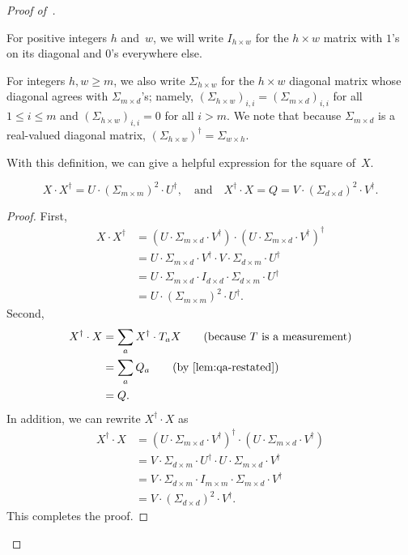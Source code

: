 \begin{proof}[Proof of~]
\begin{notation}
For positive integers $h$ and~$w$,
we will write $I_{h \times w}$ for the $h \times w$ matrix with $1$'s on its diagonal and $0$'s everywhere else.

For integers $h, w \geq m$, we also write $\Sigma_{h \times w}$
for the $h \times w$ diagonal matrix whose diagonal agrees with $\Sigma_{m \times d}$'s;
namely, $(\Sigma_{h \times w})_{i, i} = (\Sigma_{m \times d})_{i,i}$ for all $1 \leq i \leq m$
and $(\Sigma_{h \times w})_{i, i} = 0$ for all $i > m$.
We note that because $\Sigma_{m \times d}$ is a real-valued diagonal matrix,
$(\Sigma_{h \times w})^\dagger = \Sigma_{w \times h}$.
\end{notation}

With this definition,
we can give a helpful expression for the square of~$X$.

\begin{lemma}[$X$ squared]\label{lem:X-squared}
\begin{equation*}
X \cdot X^\dagger = U  \cdot (\Sigma_{m \times m})^2 \cdot U^\dagger,
\quad
\text{and}
\quad
X^\dagger \cdot X = Q = V \cdot (\Sigma_{d \times d})^2 \cdot V^\dagger.
\end{equation*}
\end{lemma}
\begin{proof}
First,
\begin{align*}
X \cdot X^\dagger
&= (U  \cdot \Sigma_{m \times d} \cdot V^\dagger) \cdot (U  \cdot \Sigma_{m \times d} \cdot V^\dagger)^\dagger\\
&= U  \cdot \Sigma_{m \times d} \cdot V^\dagger \cdot V \cdot \Sigma_{d \times m} \cdot U^\dagger\\
&= U  \cdot \Sigma_{m \times d} \cdot I_{d \times d} \cdot \Sigma_{d \times m} \cdot U^\dagger \tag{because~$V$ is a $d \times d$ unitary}\\
&= U  \cdot (\Sigma_{m \times m})^2 \cdot U^\dagger \tag{because~$m \leq d$}.
\end{align*}
Second,
\begin{align*}
X^\dagger \cdot X
& = \sum_a X^\dagger \cdot T_a X  \tag{because~$T$ is a measurement}\\
&= \sum_a Q_a \tag{by \Cref{lem:qa-restated}}\\
&= Q.
\end{align*}
In addition, we can rewrite $X^\dagger \cdot X$ as
\begin{align*}
X^\dagger \cdot X
&= (U  \cdot \Sigma_{m \times d} \cdot V^\dagger)^\dagger \cdot (U  \cdot \Sigma_{m \times d} \cdot V^\dagger)\\
&= V \cdot \Sigma_{d \times m} \cdot U^\dagger \cdot U \cdot \Sigma_{m \times d} \cdot V^\dagger\\
&= V \cdot \Sigma_{d \times m} \cdot I_{m \times m} \cdot \Sigma_{m \times d} \cdot V^\dagger \tag{because~$U$ is an $m \times m$ unitary}\\
&= V \cdot (\Sigma_{d \times d})^2 \cdot V^\dagger.
\end{align*}
This completes the proof.
\end{proof}


\end{proof}
